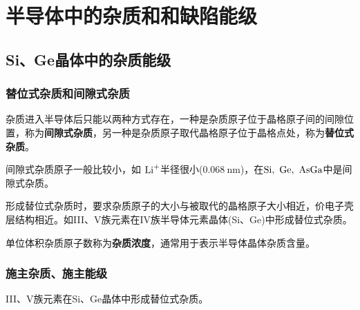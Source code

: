 \chapter{半导体中的杂质和和缺陷能级}

\section{Si、Ge晶体中的杂质能级}

\subsection{替位式杂质和间隙式杂质}

杂质进入半导体后只能以两种方式存在，一种是杂质原子位于晶格原子间的间隙位置，称为\textbf{间隙式杂质}，另一种是杂质原子取代晶格原子位于晶格点处，称为\textbf{替位式杂质}。

间隙式杂质原子一般比较小，如 $\ce{Li+}$半径很小($0.068\ \mathrm{nm}$)，在$\ce{Si},\ \ce{Ge},\ \ce{AsGa}$中是间隙式杂质。

形成替位式杂质时，要求杂质原子的大小与被取代的晶格原子大小相近，价电子壳层结构相近。如III、V族元素在IV族半导体元素晶体(Si、Ge)中形成替位式杂质。

单位体积杂质原子数称为\textbf{杂质浓度}，通常用于表示半导体晶体杂质含量。

\subsection{施主杂质、施主能级} 

III、V族元素在Si、Ge晶体中形成替位式杂质。

